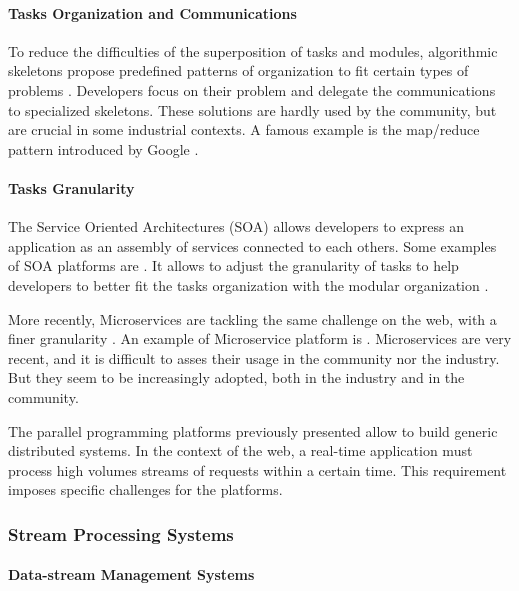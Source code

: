 \paragraph{Tasks Organization and Communications}

To reduce the difficulties of the superposition of tasks and modules, algorithmic skeletons propose predefined patterns of organization to fit certain types of problems \cite{Cole1988, Dean2008, McCool2010, Gonzalez-Velez2010}.
Developers focus on their problem and delegate the communications to specialized skeletons.
These solutions are hardly used by the community, but are crucial in some industrial contexts.
A famous example is the map/reduce pattern introduced by Google \cite{Dean2008}.

\paragraph{Tasks Granularity}

The Service Oriented Architectures (SOA) allows developers to express an application as an assembly of services connected to each others.
Some examples of SOA platforms are .
It allows to adjust the granularity of tasks to help developers to better fit the tasks organization with the modular organization \cite{Adam2008}.

More recently, Microservices are tackling the same challenge on the web, with a finer granularity \cite{Fernandez-Villamor2010,Fowler2014,Namiot2014}.
An example of Microservice platform is .
Microservices are very recent, and it is difficult to asses their usage in the community nor the industry.
But they seem to be increasingly adopted, both in the industry and in the community.

\separator

The parallel programming platforms previously presented allow to build generic distributed systems.
In the context of the web, a real-time application must process high volumes streams of requests within a certain time.
This requirement imposes specific challenges for the platforms.

\subsubsection{Stream Processing Systems}

\paragraph{Data-stream Management Systems}

